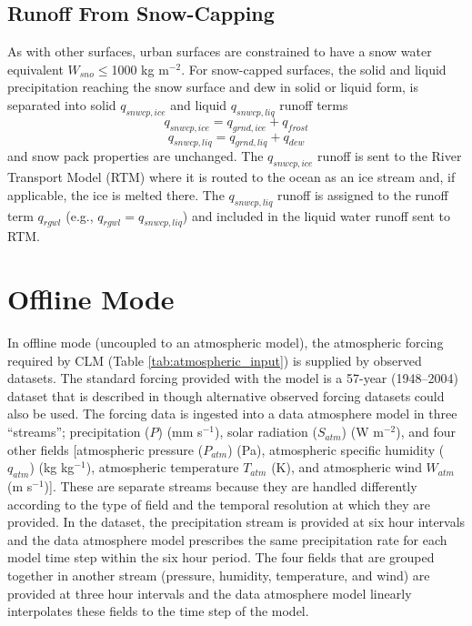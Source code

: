 \documentclass[12pt,authoryear]{elsarticle}
\numberwithin{equation}{section} %
\begin{document}
\subsection{Runoff From Snow-Capping}
\label{sec:runoff_snow_capping}
%
As with other surfaces, urban surfaces are constrained to have a snow water equivalent $W_{sno}\leq$1000 kg m$^{-2}$. For snow-capped surfaces, the solid and liquid precipitation reaching the snow surface and dew in solid or liquid form, is separated into solid $q_{snwcp,ice}$ and liquid $q_{snwcp,liq}$ runoff terms
\begin{equation}
q_{snwcp,ice}=q_{grnd,ice}+q_{frost}
\end{equation}
\begin{equation}
q_{snwcp,liq}=q_{grnd,liq}+q_{dew}
\end{equation}
and snow pack properties are unchanged. The $q_{snwcp,ice}$ runoff is sent to the River
Transport Model (RTM) where it is routed to the ocean as an ice stream and, if applicable, the ice is melted there. The $q_{snwcp,liq}$ runoff is assigned to the runoff term $q_{rgwl}$ (e.g., $q_{rgwl}=q_{snwcp,liq}$) and included in the liquid water runoff sent to RTM.

\section{Offline Mode}
\label{sec:offline_mode}
%
In offline mode (uncoupled to an atmospheric model), the atmospheric forcing required by CLM (Table \ref{tab:atmospheric_input}) is supplied by observed datasets. The standard forcing provided with the model is a 57-year (1948--2004) dataset that is described in \cite{qianSimulationGlobalLand2006} though alternative observed forcing datasets could also be used. The forcing data is ingested into a data atmosphere model in three ``streams''; precipitation ($P$) (mm s$^{-1}$), solar radiation ($S_{atm}$) (W m$^{-2}$), and four other fields [atmospheric pressure ($P_{atm}$) (Pa), atmospheric specific humidity ($q_{atm}$) (kg kg$^{-1}$), atmospheric temperature $T_{atm}$ (K), and atmospheric wind $W_{atm}$ (m s$^{-1}$)]. These are separate streams because they are handled differently according to the type of field and the temporal resolution at which they are provided. In the \cite{qianSimulationGlobalLand2006} dataset, the precipitation stream is provided at six hour intervals and the data atmosphere model prescribes the same precipitation rate for each model time step within the six hour period. The four fields that are grouped together in another stream (pressure, humidity, temperature, and wind) are provided at three hour intervals and the data atmosphere model linearly interpolates these fields to the time step of the model.
\end{document}
